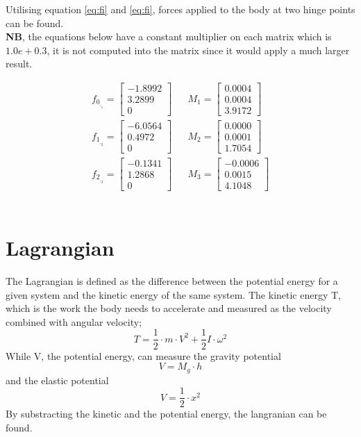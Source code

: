 \noindent
Utilising equation \ref{eq:fi} and \ref{eq:fi}, forces applied to the body at two hinge points can be found.\\
\textbf{NB}, the equations below have a constant multiplier on each matrix which is $1.0e+0.3$, it is not computed into the matrix since it would apply a much larger result.

\begin{align}
    f_0_,_1=
\left[\begin{matrix}
    -1.8992\\
    3.2899\\
    0
\end{matrix}\right]&&
M_1=\left[\begin{matrix}
    0.0004\\
    0.0004\\
    3.9172
\end{matrix}\right]\\
    f_1_,_2=
\left[\begin{matrix}
    -6.0564\\
    0.4972\\
    0
\end{matrix}\right]&& 
M_2=
\left[\begin{matrix}
    0.0000\\
    0.0001\\
    1.7054
\end{matrix}\right]\\
    f_2_,_3=
\left[\begin{matrix}
    -0.1341\\
    1.2868\\
    0
\end{matrix}\right]&&
M_3=\left[\begin{matrix}
    -0.0006\\
    0.0015\\
    4.1048
\end{matrix}\right]
\end{align}
\\

\section{Lagrangian}
The Lagrangian is defined as the difference between the potential energy for a given system and the kinetic energy of the same system. The kinetic energy T, which is the work the body needs to accelerate and measured as the velocity combined with angular velocity;
\begin{equation}
   T=\dfrac{1}{2}\cdot m \cdot V^2 + \dfrac{1}{2}I\cdot \omega^2
\end{equation}
While V, the potential energy, can measure the gravity potential
\begin{equation}
  V=M_g\cdot h  
\end{equation}
and the elastic potential 
\begin{equation}
   V=\dfrac{1}{2}\cdot x^2 
\end{equation}
By substracting the kinetic and the potential energy, the langranian can be found.

